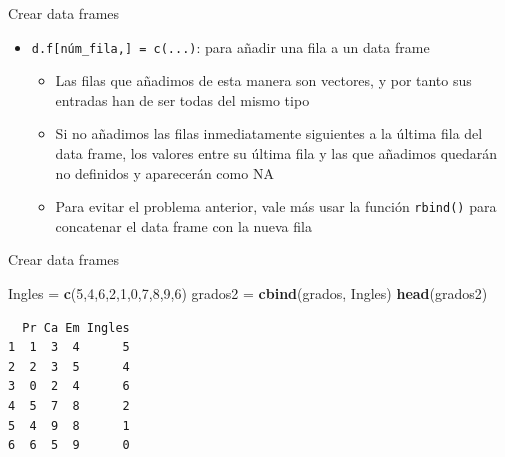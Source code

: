 \documentclass[
  ignorenonframetext,
]{beamer}
\newenvironment{Shaded}{\begin{snugshade}}{\end{snugshade}}
\newcommand{\DecValTok}[1]{\textcolor[rgb]{0.00,0.00,0.81}{#1}}
\newcommand{\FunctionTok}[1]{\textcolor[rgb]{0.13,0.29,0.53}{\textbf{#1}}}
\newcommand{\NormalTok}[1]{#1}
\newcommand{\OtherTok}[1]{\textcolor[rgb]{0.56,0.35,0.01}{#1}}
\providecommand{\tightlist}{%
  \setlength{\itemsep}{0pt}\setlength{\parskip}{0pt}}
\begin{document}
\begin{frame}[fragile]{Crear data frames}
\label{crear-data-frames-3}
\begin{itemize}
\tightlist
\item
  \texttt{d.f{[}núm\_fila,{]}\ =\ c(...)}: para añadir una fila a un
  data frame

  \begin{itemize}
  \tightlist
  \item
    Las filas que añadimos de esta manera son vectores, y por tanto sus
    entradas han de ser todas del mismo tipo
  \item
    Si no añadimos las filas inmediatamente siguientes a la última fila
    del data frame, los valores entre su última fila y las que añadimos
    quedarán no definidos y aparecerán como NA
  \item
    Para evitar el problema anterior, vale más usar la función
    \texttt{rbind()} para concatenar el data frame con la nueva fila
  \end{itemize}
\end{itemize}
\end{frame}

\begin{frame}[fragile]{Crear data frames}
\label{crear-data-frames-4}
\begin{Shaded}
\begin{Highlighting}[]
\NormalTok{Ingles }\OtherTok{=} \FunctionTok{c}\NormalTok{(}\DecValTok{5}\NormalTok{,}\DecValTok{4}\NormalTok{,}\DecValTok{6}\NormalTok{,}\DecValTok{2}\NormalTok{,}\DecValTok{1}\NormalTok{,}\DecValTok{0}\NormalTok{,}\DecValTok{7}\NormalTok{,}\DecValTok{8}\NormalTok{,}\DecValTok{9}\NormalTok{,}\DecValTok{6}\NormalTok{)}
\NormalTok{grados2 }\OtherTok{=} \FunctionTok{cbind}\NormalTok{(grados, Ingles)}
\FunctionTok{head}\NormalTok{(grados2)}
\end{Highlighting}
\end{Shaded}

\begin{verbatim}
  Pr Ca Em Ingles
1  1  3  4      5
2  2  3  5      4
3  0  2  4      6
4  5  7  8      2
5  4  9  8      1
6  6  5  9      0
\end{verbatim}
\end{frame}
\end{document}
